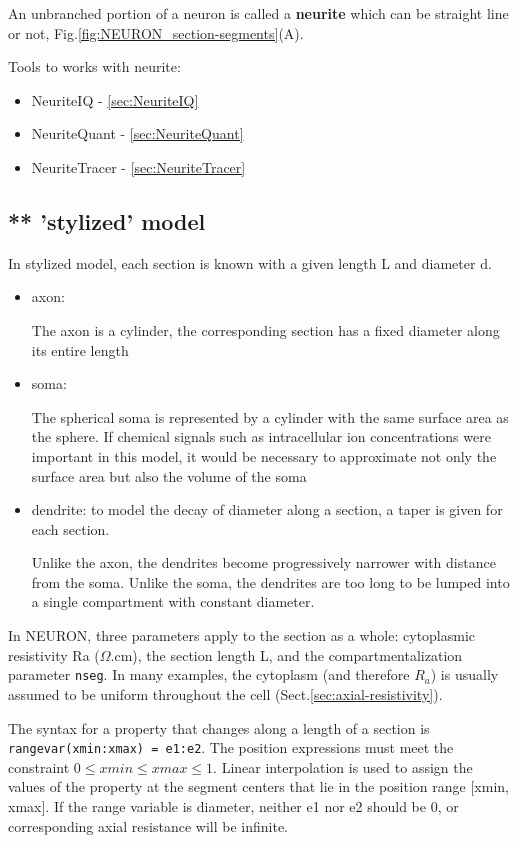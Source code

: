 An unbranched portion of a neuron is called a {\bf neurite} which can be
straight line or not, Fig.\ref{fig:NEURON_section-segments}(A). 

Tools to works with neurite:
\begin{itemize}
  \item NeuriteIQ - \ref{sec:NeuriteIQ}
  \item NeuriteQuant - \ref{sec:NeuriteQuant}
  \item NeuriteTracer - \ref{sec:NeuriteTracer}
\end{itemize}

\subsection{** 'stylized' model}
\label{sec:stylized-model-NEURON}

In stylized model, each section is known with a given length L and diameter d.
\begin{itemize}
  \item axon: 
  
  The axon is a cylinder, the corresponding section has a fixed diameter along
  its entire length
  
  \item soma:
  
  The spherical soma is represented by a cylinder with the same surface area as
  the sphere.
  If chemical signals such as intracellular ion concentrations were important in
  this model, it would be necessary to approximate not only the surface area but
  also the volume of the soma
  
  \item dendrite: to model the decay of diameter along a section, a taper is
  given for each section.
  
  Unlike the axon, the dendrites become progressively narrower with distance
  from the soma. Unlike the soma, the dendrites are too long to be lumped into a
  single compartment with constant diameter.
  
\end{itemize}

In NEURON, three parameters apply to the section as a whole: cytoplasmic
resistivity Ra ($\Omega$.cm), the section length L, and the compartmentalization
parameter \verb!nseg!.
In many examples, the cytoplasm (and therefore $R_a$) is usually assumed to be
uniform throughout the cell (Sect.\ref{sec:axial-resistivity}).

The syntax for a property that changes along a length of a section is
\verb!rangevar(xmin:xmax) = e1:e2!.
The position expressions must meet the constraint $0 \le xmin \le xmax \le 1$.
Linear interpolation is used to assign the values of the property at the segment
centers that lie in the position range [xmin, xmax].
If the range variable is diameter, neither e1 nor e2 should be 0, or
corresponding axial resistance will be infinite.

